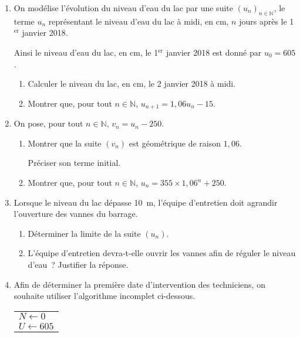 \begin{enumerate}
     \item On modélise l'évolution du niveau d'eau du lac par une suite $(u_n)_{n\in \mathbb{N}}$, le terme $u_n$ représentant le niveau d'eau du lac à midi, en cm, $n$ jours après le 1${^\text{er}}$ janvier 2018.
     \par
     Ainsi le niveau d'eau du lac, en cm, le 1${^\text{er}}$ janvier 2018 est donné par $u_0=605$.
     \begin{enumerate}[label=\alph*.]
          \item Calculer le niveau du lac, en cm, le 2 janvier 2018 à midi.
          \item Montrer que, pour tout $n\in\mathbb{N}$, $u_{n+1}=1,06 u_n - 15$.
     \end{enumerate}
     \item On pose, pour tout $n\in \mathbb{N}$, $v_n=u_n-250$.
     \begin{enumerate}[label=\alph*.]
          \item Montrer que la suite $(v_n)$ est géométrique de raison $1,06$.
          \par
          Préciser son terme initial.
          \item Montrer que, pour tout $n\in\mathbb{N}$, $u_n=355\times 1,06^{n}+250$.
     \end{enumerate}
     \item Lorsque le niveau du lac dépasse 10~m, l'équipe d'entretien doit agrandir l'ouverture des vannes du barrage.
     \begin{enumerate}[label=\alph*.]
          \item Déterminer la limite de la suite $(u_n)$.
          \item L'équipe d'entretien devra-t-elle ouvrir les vannes afin de réguler le niveau d'eau~? Justifier la réponse.
     \end{enumerate}
     \item Afin de déterminer la première date d'intervention des techniciens, on souhaite utiliser l'algorithme incomplet ci-dessous.
     \begin{center}
          \begin{extern}%
               \renewcommand{\arraystretch}{1.2}
               \begin{tabular}{|p{5cm}|}
                    \hline
                    $N \leftarrow 0$\\
                    $U \leftarrow 605$\\

\end{tabular}
\end{extern}
\end{center}
\end{enumerate}
